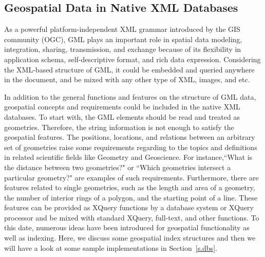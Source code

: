 \documentclass[a4paper,12pt]{article}
\begin{document}
\subsection{Geospatial Data in Native XML Databases}
\label{s.geo-data-in-xml-data}
As a powerful platform-independent XML grammar introduced by the GIS community (OGC), GML plays an important role in spatial data modeling, integration, sharing, transmission, and exchange because of its flexibility in application schema, self-descriptive format, and rich data expression. Considering the XML-based structure of GML, it could be embedded and queried anywhere in the document, and be mixed with any other type of XML, images, and etc. 

In addition to the general functions and features on the structure of GML data, geospatial concepts and requirements could be included in the native XML databases. To start with, the GML elements should be read and treated as geo\-metries. Therefore, the string information is not enough to satisfy the geospatial features. The positions, locations, and relations between an arbitrary set of geo\-metries raise some requirements regarding to the topics and definitions in related scientific fields like Geometry and Geoscience. For instance,``What is the distance between two geometries?" or ``Which geometries intersect a particular geometry?" are examples of such requirements. Furthermore, there are features related to single geometries, such as the length and area of a geometry, the number of interior rings of a polygon, and the starting point of a line. These features can be provided as XQuery functions by a database system or XQuery processor and be mixed with standard XQuery, full-text, and other functions.
To this date, numerous ideas have been introduced for geospatial functionality as well as indexing. Here, we discuss some geospatial index structures and then we will have a look at some sample implementations in Section~\ref{s.dbs}.

\end{document}
